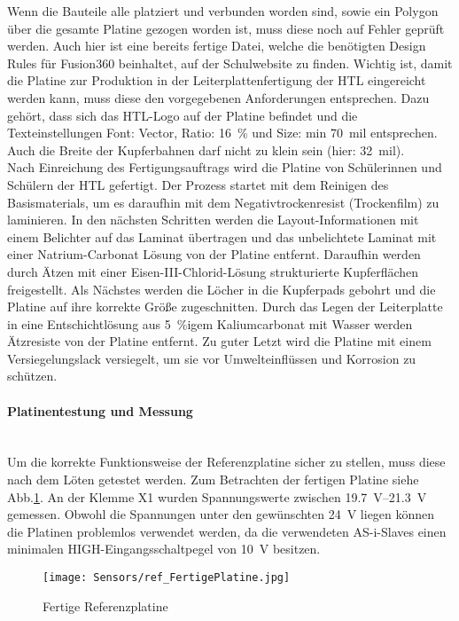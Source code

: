 Wenn die Bauteile alle platziert und verbunden worden sind, sowie ein Polygon über die gesamte Platine gezogen worden ist, muss diese noch auf Fehler geprüft werden. Auch hier ist eine bereits fertige Datei, welche die benötigten Design Rules für Fusion360 beinhaltet, auf der Schulwebsite zu finden. Wichtig ist, damit die Platine zur Produktion in der Leiterplattenfertigung der HTL eingereicht werden kann, muss diese den vorgegebenen Anforderungen entsprechen. Dazu gehört, dass sich das HTL-Logo auf der Platine befindet und die Texteinstellungen Font: Vector, Ratio: \qty{16}{\percent} und Size: min \qty{70}{mil} entsprechen. Auch die Breite der Kupferbahnen darf nicht zu klein sein (hier: \qty{32}{mil}).\\
Nach Einreichung des Fertigungsauftrags wird die Platine von Schülerinnen und Schülern der HTL gefertigt. Der Prozess startet mit dem Reinigen des Basismaterials, um es daraufhin mit dem Negativtrockenresist (Trockenfilm) zu laminieren. In den nächsten Schritten werden die Layout-Informationen mit einem Belichter auf das Laminat übertragen und das unbelichtete Laminat mit einer Natrium-Carbonat Lösung von der Platine entfernt. Daraufhin werden durch Ätzen mit einer Eisen-III-Chlorid-Lösung strukturierte Kupferflächen freigestellt. Als Nächstes werden die Löcher in die Kupferpads gebohrt und die Platine auf ihre korrekte Größe zugeschnitten. Durch das Legen der Leiterplatte in eine Entschichtlösung aus \qty{5}{\percent}{igem} Kaliumcarbonat mit Wasser werden Ätzresiste von der Platine entfernt. Zu guter Letzt wird die Platine mit einem Versiegelungslack versiegelt, um sie vor Umwelteinflüssen und Korrosion zu schützen.

\paragraph{Platinentestung und Messung} \mbox{}\\
Um die korrekte Funktionsweise der Referenzplatine sicher zu stellen, muss diese nach dem Löten getestet werden. Zum Betrachten der fertigen Platine siehe Abb.\ref{Ref_fertig}. An der Klemme X1 wurden Spannungswerte zwischen \qtyrange{19.7}{21.3}{\volt} gemessen. Obwohl die Spannungen unter den gewünschten \qty{24}{\volt} liegen können die Platinen problemlos verwendet werden, da die verwendeten AS-i-Slaves einen minimalen HIGH-Eingangsschaltpegel von \qty{10}{\volt} besitzen.\cite{AS-i-Slave}

\begin{figure}[H]
    \centering
    \texttt{[image: Sensors/ref\_FertigePlatine.jpg]}
    \caption{Fertige Referenzplatine}
    \label{Ref_fertig}
\end{figure}

